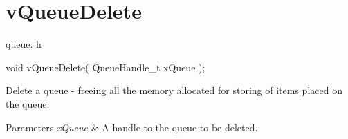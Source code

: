 \hypertarget{group__vQueueDelete}{}\section{v\+Queue\+Delete}
\label{group__vQueueDelete}
queue. h 
\begin{DoxyPre}void vQueueDelete( QueueHandle\_t xQueue );\end{DoxyPre}


Delete a queue -\/ freeing all the memory allocated for storing of items placed on the queue.


\begin{DoxyParams}{Parameters}
{\em x\+Queue} & A handle to the queue to be deleted. \\
\hline
\end{DoxyParams}
